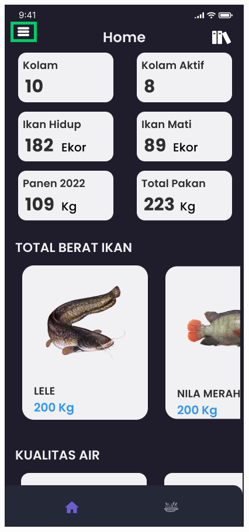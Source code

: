 \begin{enumerate}
\begin{enumerate}
\begin{figure}[H]
			  \includegraphics[width=\linewidth]{gambar/sprint1/mockup_dashboard.png}

\end{figure}
\end{enumerate}
\end{enumerate}
